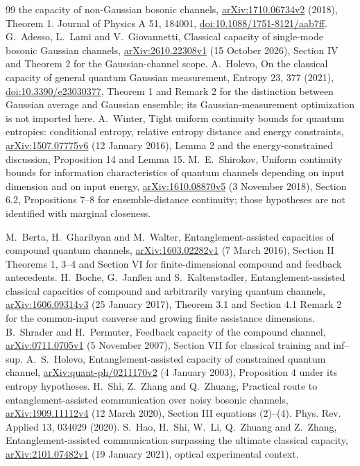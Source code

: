 \documentclass[11pt]{article}
\begin{document}
\begin{thebibliography}{99}
the capacity of non-Gaussian bosonic channels,
\href{https://arxiv.org/abs/1710.06734v2}{arXiv:1710.06734v2} (2018),
Theorem 1. Journal of Physics A 51, 184001,
\href{https://doi.org/10.1088/1751-8121/aab7ff}{doi:10.1088/1751-8121/aab7ff}.
 G.~Adesso, L.~Lami and V.~Giovannetti,
Classical capacity of single-mode bosonic Gaussian channels,
\href{https://arxiv.org/abs/2610.22308v1}{arXiv:2610.22308v1}
(15 October 2026), Section IV and Theorem 2 for the Gaussian-channel scope.
 A.~Holevo, On the classical capacity of
general quantum Gaussian measurement, Entropy 23, 377 (2021),
\href{https://doi.org/10.3390/e23030377}{doi:10.3390/e23030377},
Theorem 1 and Remark 2 for the distinction between Gaussian average
and Gaussian ensemble; its Gaussian-measurement optimization is not
imported here.
 A.~Winter, Tight uniform continuity bounds for quantum
entropies: conditional entropy, relative entropy distance and energy
constraints, \href{https://arxiv.org/abs/1507.07775v6}{arXiv:1507.07775v6}
(12 January 2016), Lemma 2 and the energy-constrained discussion,
Proposition 14 and Lemma 15.
 M.~E.~Shirokov, Uniform continuity bounds for
information characteristics of quantum channels depending on input
dimension and on input energy,
\href{https://arxiv.org/abs/1610.08870v5}{arXiv:1610.08870v5}
(3 November 2018), Section 6.2, Propositions 7--8 for ensemble-distance
continuity; those hypotheses are not identified with marginal closeness.

 M.~Berta, H.~Gharibyan and M.~Walter,
Entanglement-assisted capacities of compound quantum channels,
\href{https://arxiv.org/abs/1603.02282v1}{arXiv:1603.02282v1}
(7 March 2016), Section II Theorems 1, 3--4 and Section VI for
finite-dimensional compound and feedback antecedents.
 H.~Boche, G.~Jan\ss en and S.~Kaltenstadler,
Entanglement-assisted classical capacities of compound and arbitrarily
varying quantum channels,
\href{https://arxiv.org/abs/1606.09314v3}{arXiv:1606.09314v3}
(25 January 2017), Theorem 3.1 and Section 4.1 Remark 2 for the
common-input converse and growing finite assistance dimensions.
 B.~Shrader and H.~Permuter, Feedback capacity of
the compound channel,
\href{https://arxiv.org/abs/0711.0705v1}{arXiv:0711.0705v1}
(5 November 2007), Section VII for classical training and inf--sup.
 A.~S.~Holevo, Entanglement-assisted
capacity of constrained quantum channel,
\href{https://arxiv.org/abs/quant-ph/0211170v2}{arXiv:quant-ph/0211170v2}
(4 January 2003), Proposition 4 under its entropy hypotheses.
 H.~Shi, Z.~Zhang and Q.~Zhuang, Practical route to
entanglement-assisted communication over noisy bosonic channels,
\href{https://arxiv.org/abs/1909.11112v4}{arXiv:1909.11112v4}
(12 March 2020), Section III equations (2)--(4).
Phys. Rev. Applied 13, 034029 (2020).
 S.~Hao, H.~Shi, W.~Li, Q.~Zhuang and Z.~Zhang,
Entanglement-assisted communication surpassing the ultimate classical
capacity, \href{https://arxiv.org/abs/2101.07482v1}{arXiv:2101.07482v1}
(19 January 2021), optical experimental context.

\end{thebibliography}
\end{document}
